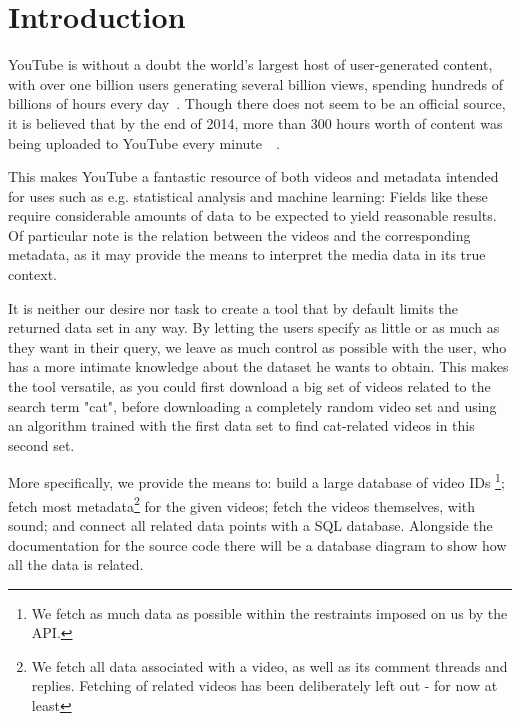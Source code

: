 
\section{Introduction}

YouTube is without a doubt the world's largest host of user-generated content,
with over one billion users generating several billion views, spending hundreds
of billions of hours every day~\cite{officialstats}. Though there does not seem
to be an official source, it is believed that by the end of 2014, more than 300
hours worth of content was being uploaded to YouTube every
minute~\cite{dagensmediastats}~\cite{reelseostats}. 

This makes YouTube a fantastic resource of both videos and metadata intended for
uses such as e.g. statistical analysis and machine learning: Fields like these
require considerable amounts of data to be expected to yield reasonable results.
Of particular note is the relation between the videos and the corresponding 
metadata, as it may provide the means to interpret the media data in its true
context.

It is neither our desire nor task to create a tool that by default limits the
returned data set in any way. By letting the users specify as little or as much
as they want in their query, we leave as much control as possible with the user,
who has a more intimate knowledge about the dataset he wants to obtain.
This makes the tool versatile, as you could first
download a big set of videos related to the search term "cat", before
downloading a completely random video set and using an algorithm trained with
the first data set to find cat-related videos in this second set. 

More specifically, we provide the means to: build a large database of video IDs
\footnote{We fetch as much data as possible within the restraints imposed
on us by the API.}; fetch most metadata\footnote{We fetch all data associated
with a video, as well as its comment threads and replies. Fetching of related
videos has been deliberately left out - for now at least} for the given videos;
fetch the videos themselves, with sound; and connect all related data points
with a SQL database. Alongside the documentation for the source code there will
be a database diagram to show how all the data is related.

